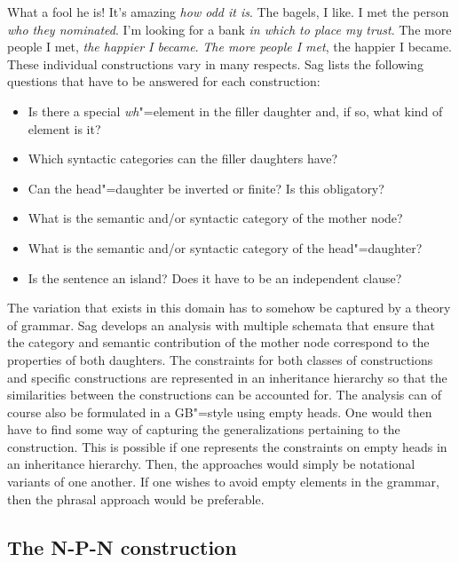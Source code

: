 \begin{exe}
\begin{xlist}[iv.]
\begin{exe}
\begin{xlist}[iv.]
\eal
\ex What a fool he is!
\ex It's amazing \emph{how odd it is}.
\zl
\ea
The bagels, I like.
\z
\eal
\ex I met the person \emph{who they nominated}.
\ex I'm looking for a bank \emph{in which to place my trust}.
\zl
\eal
\ex The more people I met, \emph{the happier I became}.
\ex \emph{The more people I met}, the happier I became.
\zl
These individual constructions vary in many respects. Sag lists the following questions that have to be answered
for each construction:
\begin{itemize}
\item Is there a special \emph{wh}"=element in the filler daughter and, if so, what kind of element is it?
\item Which syntactic categories can the filler daughters have?
\item Can the head"=daughter be inverted or finite? Is this obligatory?
\item What is the semantic and/or syntactic category of the mother node?
\item What is the semantic and/or syntactic category of the head"=daughter?
\item Is the sentence an island? Does it have to be an independent clause?
\end{itemize}
The variation that exists in this domain has to somehow be captured by a theory of grammar. Sag develops an analysis with multiple schemata
that ensure that the category and semantic contribution of the mother node correspond to the properties of both daughters. The constraints for both classes of
constructions and specific constructions are represented in an inheritance hierarchy so that the similarities between the constructions can be
accounted for. The analysis can of course also be formulated in a GB"=style using empty heads. One would then have to find some way of capturing
the generalizations pertaining to the construction. This is possible if one represents the constraints on empty heads in an inheritance hierarchy. Then, the approaches
would simply be notational variants of one another. If one wishes to avoid empty elements in the grammar, then the phrasal approach would be preferable.

\subsection{The N-P-N construction}
\label{Abschnitt-NPN-Konstruktion}


\end{xlist}
\end{exe}
\end{xlist}
\end{exe}
